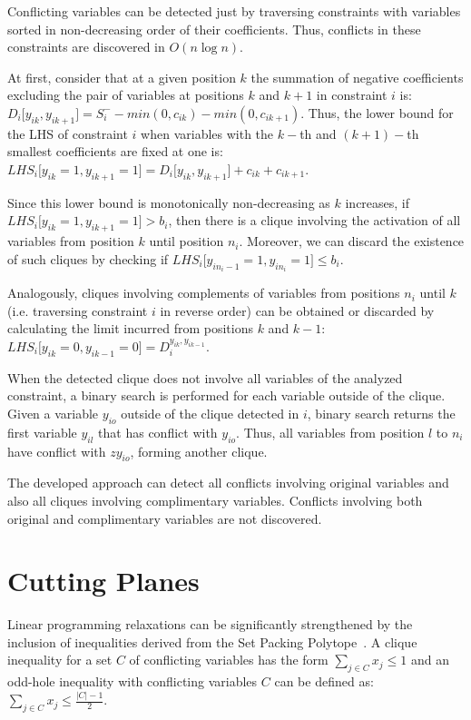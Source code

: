 \documentclass{endm}
\begin{document}
Conflicting variables can be detected just by traversing constraints with variables sorted in non-decreasing order of their coefficients. Thus, conflicts in these constraints are discovered in $O(n \log n)$. 

At first, consider that at a given position $k$ the summation of negative coefficients excluding the pair of variables at positions $k$ and $k+1$ in constraint $i$ is: $\displaystyle D_{i}\lbrack y_{ik}, y_{ik+1} \rbrack = S_i^- - min(0, c_{ik}) - min(0, c_{ik+1})$.  Thus, the lower bound for the LHS of constraint $i$ when variables with the $k-$th and $(k+1)-$th smallest coefficients are fixed at one is: $\displaystyle LHS_{i}\lbrack y_{ik} = 1, y_{ik+1} = 1 \rbrack = D_{i}\lbrack y_{ik}, y_{ik+1}\rbrack + c_{ik} + c_{ik+1}$.

Since this lower bound is monotonically non-decreasing as $k$ increases, if $\displaystyle LHS_{i}\lbrack y_{ik} = 1, y_{ik+1} = 1 \rbrack > b_{i}$, then there is a clique involving the activation of all variables from position $k$ until position $n_i$. Moreover, we can discard the existence of such cliques by checking if $\displaystyle LHS_{i}\lbrack y_{in_i-1} = 1, y_{in_i} = 1 \rbrack \leq b_i$.

Analogously, cliques involving complements of variables from positions $n_i$ until $k$ (i.e. traversing constraint $i$ in reverse order) can be obtained or discarded by calculating the limit incurred from positions $k$ and $k-1$: $\displaystyle LHS_{i}\lbrack y_{ik} = 0, y_{ik-1} = 0 \rbrack = D_{i}^{y_{ik}, y_{ik-1}} $.

When the detected clique does not involve all variables of the analyzed constraint, a binary search is performed for each variable outside of the clique. Given a variable $y_{io}$ outside of the clique detected in $i$, binary search returns the first variable $y_{il}$ that has conflict with $y_{io}$. Thus, all variables from position $l$ to $n_i$ have conflict with $zy_{io}$, forming another clique.

The developed approach can detect all conflicts involving original variables and also all cliques involving complimentary variables. Conflicts involving both original and complimentary variables are not discovered.

\section{Cutting Planes}\label{cut}

Linear programming relaxations can be significantly strengthened by the inclusion of inequalities derived from the Set Packing Polytope~\cite{Padberg1973,Rebennack2009}. A clique inequality for a set $C$ of conflicting variables has the form $ \sum_{j\in C}x_{j} \leq 1$ and an odd-hole inequality with conflicting variables $C$ can be defined as: $ \sum_{j\in C}x_{j} \leq \frac{|C|-1}{2}$.
\end{document}
